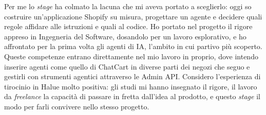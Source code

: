 Per me lo \emph{stage} ha colmato la lacuna che mi aveva portato a sceglierlo: oggi so costruire
un’applicazione Shopify su misura, progettare un agente e decidere quali regole affidare alle
istruzioni e quali al codice. Ho portato nel progetto il rigore appreso in Ingegneria del Software,
dosandolo per un lavoro esplorativo, e ho affrontato per la prima volta gli agenti di IA, l’ambito
in cui partivo più scoperto. Queste competenze entrano direttamente nel mio lavoro in proprio, dove
intendo inserire agenti come quello di ChatCart in diverse parti dei negozi che seguo e gestirli con
strumenti agentici attraverso le Admin API. Considero l’esperienza di tirocinio in Halue molto
positiva: gli studi mi hanno insegnato il rigore, il lavoro da \emph{freelance} la capacità di
passare in fretta dall’idea al prodotto, e questo \emph{stage} il modo per farli convivere nello
stesso progetto.

